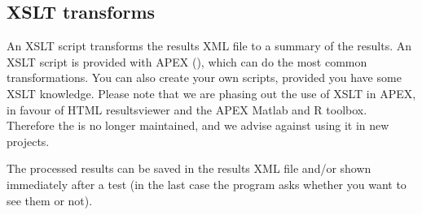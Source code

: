 \todo{}

\subsection{XSLT transforms}

An XSLT script transforms the results XML file to a summary of the
results. An XSLT script is provided with APEX (), which can do the most common transformations. You can also create your own scripts, provided you have some XSLT knowledge. Please note that we are phasing out the use of XSLT in APEX, in favour of HTML resultsviewer and the APEX Matlab and R toolbox. Therefore the  is no longer maintained, and we advise against using it in new projects.

\label{sec:Using XSLT transforms}


The processed results can be saved in the results XML file and/or
shown immediately after a test (in the last case the program asks
whether you want to see them or not).

